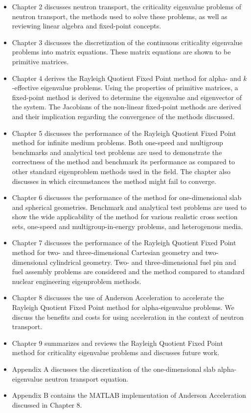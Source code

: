 \begin{itemize}
	\item Chapter 2 discusses neutron transport, the criticality eigenvalue problems of neutron transport, the methods used to solve these problems, as well as reviewing linear algebra and fixed-point concepts.
	\item Chapter 3 discusses the discretization of the continuous criticality eigenvalue problems into matrix equations. These matrix equations are shown to be primitive matrices.
	\item Chapter 4 derives the Rayleigh Quotient Fixed Point method for alpha- and $k$-effective eigenvalue problems. Using the properties of primitive matrices, a fixed-point method is derived to determine the eigenvalue and eigenvector of the system. The Jacobians of the non-linear fixed-point methods are derived and their implication regarding the convergence of the methods discussed.
	\item Chapter 5 discusses the performance of the Rayleigh Quotient Fixed Point method for infinite medium problems. Both one-speed and multigroup benchmarks and analytical test problems are used to demonstrate the correctness of the method and benchmark its performance as compared to other standard eigenproblem methods used in the field. The chapter also discusses in which circumstances the method might fail to converge.
	\item Chapter 6 discusses the performance of the method for one-dimensional slab and spherical geometries. Benchmark and analytical test problems are used to show the wide applicability of the method for various realistic cross section sets, one-speed and multigroup-in-energy problems, and heterogenous media.
	\item Chapter 7 discusses the performance of the Rayleigh Quotient Fixed Point method for two- and three-dimensional Cartesian geometry and two-dimensional cylindrical geometry. Two- and three-dimensional fuel pin and fuel assembly problems are considered and the method compared to standard nuclear engineering eigenproblem methods.
	\item Chapter 8 discusses the use of Anderson Acceleration to accelerate the Rayleigh Quotient Fixed Point method for alpha-eigenvalue problems. We discuss the benefits and costs for using acceleration in the context of neutron transport.
	\item Chapter 9 summarizes and reviews the Rayleigh Quotient Fixed Point method for criticality eigenvalue problems and discusses future work.
	\item Appendix A discusses the discretization of the one-dimensional slab alpha-eigenvalue neutron transport equation.
	\item Appendix B contains the MATLAB implementation of Anderson Acceleration discussed in Chapter 8.
\end{itemize}

